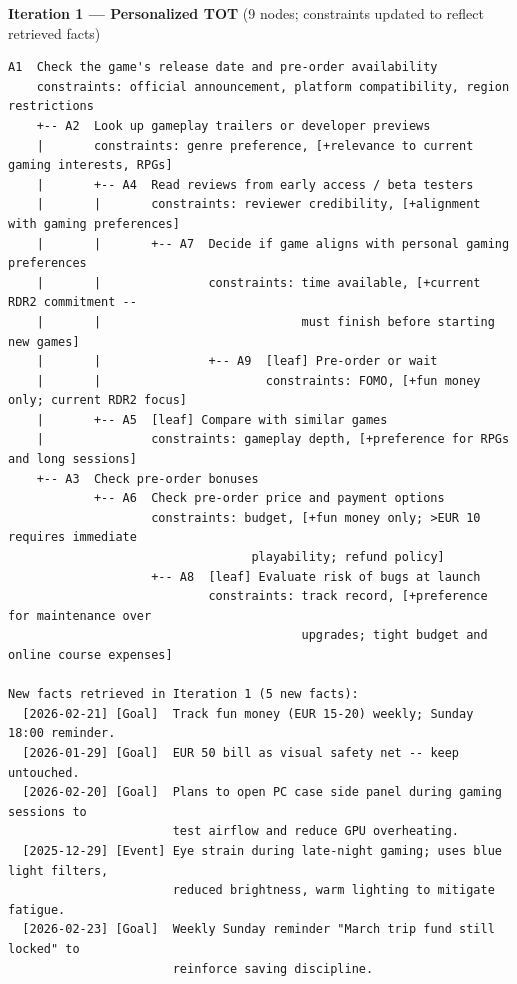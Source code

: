 \vspace{0.5em}
\noindent\textbf{Iteration 1 --- Personalized TOT} {\small(9 nodes; constraints updated to reflect retrieved facts)}
\begin{lstlisting}[style=appendixbox]
A1  Check the game's release date and pre-order availability
    constraints: official announcement, platform compatibility, region restrictions
    +-- A2  Look up gameplay trailers or developer previews
    |       constraints: genre preference, [+relevance to current gaming interests, RPGs]
    |       +-- A4  Read reviews from early access / beta testers
    |       |       constraints: reviewer credibility, [+alignment with gaming preferences]
    |       |       +-- A7  Decide if game aligns with personal gaming preferences
    |       |               constraints: time available, [+current RDR2 commitment --
    |       |                            must finish before starting new games]
    |       |               +-- A9  [leaf] Pre-order or wait
    |       |                       constraints: FOMO, [+fun money only; current RDR2 focus]
    |       +-- A5  [leaf] Compare with similar games
    |               constraints: gameplay depth, [+preference for RPGs and long sessions]
    +-- A3  Check pre-order bonuses
            +-- A6  Check pre-order price and payment options
                    constraints: budget, [+fun money only; >EUR 10 requires immediate
                                  playability; refund policy]
                    +-- A8  [leaf] Evaluate risk of bugs at launch
                            constraints: track record, [+preference for maintenance over
                                         upgrades; tight budget and online course expenses]

New facts retrieved in Iteration 1 (5 new facts):
  [2026-02-21] [Goal]  Track fun money (EUR 15-20) weekly; Sunday 18:00 reminder.
  [2026-01-29] [Goal]  EUR 50 bill as visual safety net -- keep untouched.
  [2026-02-20] [Goal]  Plans to open PC case side panel during gaming sessions to
                       test airflow and reduce GPU overheating.
  [2025-12-29] [Event] Eye strain during late-night gaming; uses blue light filters,
                       reduced brightness, warm lighting to mitigate fatigue.
  [2026-02-23] [Goal]  Weekly Sunday reminder "March trip fund still locked" to
                       reinforce saving discipline.
\end{lstlisting}

